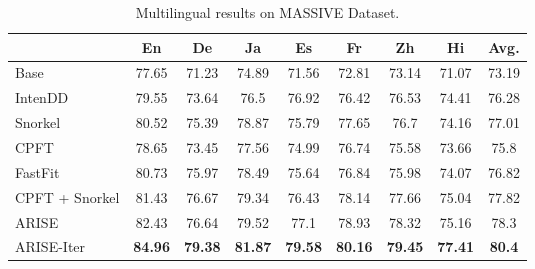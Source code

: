 \begin{table*}[!h]
\centering
\begin{tabular}{|l|c|c|c|c|c|c|c|c|}
\hline
           & \textbf{En}                  & \textbf{De}                  & \textbf{Ja}                  & \textbf{Es}                  & \textbf{Fr}                  & \textbf{Zh}                  & \textbf{Hi}                  & \textbf{Avg.} \\ \hline
Base       & 77.65                        & 71.23                        & 74.89                        & 71.56                        & 72.81                        & 73.14                        & 71.07                        & 73.19            \\ \hline
IntenDD    & 79.55                        & {\color[HTML]{565869} 73.64} & {\color[HTML]{565869} 76.5}  & {\color[HTML]{565869} 76.92} & {\color[HTML]{565869} 76.42} & {\color[HTML]{565869} 76.53} & {\color[HTML]{565869} 74.41} & 76.28            \\ \hline
Snorkel    & {\color[HTML]{565869} 80.52} & {\color[HTML]{565869} 75.39} & {\color[HTML]{565869} 78.87} & {\color[HTML]{565869} 75.79} & {\color[HTML]{565869} 77.65} & {\color[HTML]{565869} 76.7}  & {\color[HTML]{565869} 74.16} & 77.01            \\ \hline
CPFT     & 78.65                        & {\color[HTML]{565869} 73.45} & {\color[HTML]{565869} 77.56} & {\color[HTML]{565869} 74.99} & {\color[HTML]{565869} 76.74} & {\color[HTML]{565869} 75.58} & {\color[HTML]{565869} 73.66} & 75.8             \\ \hline
FastFit    & 80.73                        & 75.97                        & 78.49                        & 75.64                        & 76.84                        & 75.98                        & 74.07                        & 76.82            \\ \hline
CPFT + Snorkel    & 81.43 &	76.67	&79.34&	76.43	& 78.14 &	77.66 &	75.04 &	77.82         \\ \hline
ARISE      & 82.43                        & 76.64                        & 79.52                        & 77.1                         & 78.93                        & 78.32                        & 75.16                        & 78.3             \\ \hline
ARISE-Iter & \textbf{84.96}               & \textbf{79.38}               & \textbf{81.87}               & \textbf{79.58}               & \textbf{80.16}               & \textbf{79.45}               & \textbf{77.41}               & \textbf{80.4}    \\ \hline
\end{tabular}
\caption{Multilingual results on MASSIVE Dataset.}
\label{tab:multilingual}
\end{table*}


